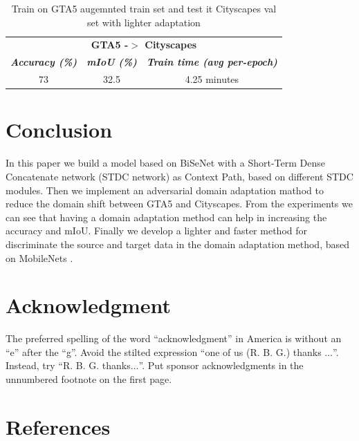 \documentclass[conference]{IEEEtran}
\begin{document}
\begin{table}[tb]
\caption{Train on GTA5 augemnted train set and test it Cityscapes val set with lighter adaptation}
\begin{center}
\begin{tabular}{|c|c|c|}
\hline
\multicolumn{3}{|c|}{\textbf{GTA5 -$>$ Cityscapes}} \\
\cline{1-3} 
\textbf{\textit{Accuracy (\%)}}& \textbf{\textit{mIoU (\%)}}& \textbf{\textit{Train time (avg per-epoch)}} \\
\hline
73& 32.5& 4.25 minutes\\
\hline
\end{tabular}
\label{GTATOCITYSCAPESADAPLIGHT}
\end{center}
\end{table}

\section{Conclusion}

In this paper we build a model based on BiSeNet \cite{b2} with a Short-Term Dense Concatenate network (STDC network) \cite{b1} as Context Path, 
based on different STDC modules. Then we implement an adversarial domain adaptation mathod \cite{b3} to reduce the domain shift between GTA5
and Cityscapes. From the experiments we can see that having a domain adaptation method can help in increasing the accuracy and mIoU. 
Finally we develop a lighter and faster method for discriminate the source and target data in the domain adaptation
method, based on MobileNets \cite{b6}. 

\section*{Acknowledgment}

The preferred spelling of the word ``acknowledgment'' in America is without 
an ``e'' after the ``g''. Avoid the stilted expression ``one of us (R. B. 
G.) thanks $\ldots$''. Instead, try ``R. B. G. thanks$\ldots$''. Put sponsor 
acknowledgments in the unnumbered footnote on the first page.

\section*{References}
\end{document}
